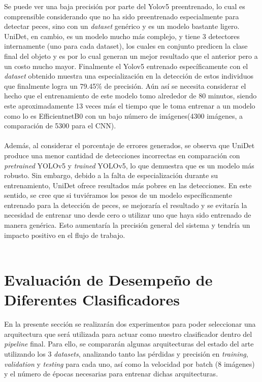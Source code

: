 Se puede ver una baja precisión por parte del Yolov5 preentrenado, lo cual es comprensible considerando que no ha sido preentrenado especialmente para detectar peces, sino con un \textit{dataset} genérico y es un modelo bastante ligero. UniDet, en cambio, es un modelo mucho más complejo, y tiene 3 detectores internamente (uno para cada dataset), los cuales en conjunto predicen la clase final del objeto y es por lo cual generan un mejor resultado que el anterior pero a un costo mucho mayor. Finalmente el Yolov5 entrenado específicamente con el \textit{dataset} obtenido muestra una especialización en la detección de estos individuos que finalmente logra un 79.45\% de precisión. Aún así se necesita considerar el hecho que el entrenamiento de este modelo tomo alrededor de 80 minutos, siendo este aproximadamente 13 veces más el tiempo que le toma entrenar a un modelo como lo es EfficientnetB0 con un bajo número de imágenes(4300 imágenes, a comparación de 5300 para el CNN).
\\\\

Además, al considerar el porcentaje de errores generados, se observa que UniDet produce una menor cantidad de detecciones incorrectas en comparación con \textit{pretrained} YOLOv5 y \textit{trained} YOLOv5, lo que demuestra que es un modelo más robusto. Sin embargo, debido a la falta de especialización durante su entrenamiento, UniDet ofrece resultados más pobres en las detecciones. En este sentido, se cree que si tuviéramos los pesos de un modelo específicamente entrenado para la detección de peces, se mejoraría el resultado y se evitaría la necesidad de entrenar uno desde cero o utilizar uno que haya sido entrenado de manera genérica. Esto aumentaría la precisión general del sistema y tendría un impacto positivo en el flujo de trabajo.
\\\\

\section{Evaluación de Desempeño de Diferentes Clasificadores}
En la presente sección se realizarán dos experimentos para poder seleccionar una arquitectura que será utilizada para actuar como nuestro clasificador dentro del \textit{pipeline} final. Para ello, se compararán algunas arquitecturas del estado del arte utilizando los 3 \textit{datasets}, analizando tanto las pérdidas y precisión en \textit{training}, \textit{validation} y \textit{testing} para cada uno, así como la velocidad por batch (8 imágenes) y el número de épocas necesarias para entrenar dichas arquitecturas. 
